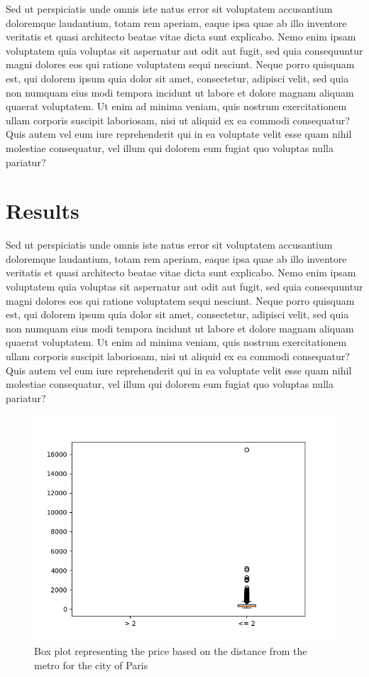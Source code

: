 \documentclass[10pt, conference, compsocconf]{IEEEtran}
\begin{document}
Sed ut perspiciatis unde omnis iste natus error sit voluptatem accusantium doloremque laudantium, totam rem aperiam, eaque ipsa quae ab illo inventore veritatis et quasi architecto beatae vitae dicta sunt explicabo. 
Nemo enim ipsam voluptatem quia voluptas sit aspernatur aut odit aut fugit, sed quia consequuntur magni dolores eos qui ratione voluptatem sequi nesciunt. Neque porro quisquam est, qui dolorem ipsum quia dolor sit amet, consectetur, adipisci velit, sed quia non numquam eius modi tempora incidunt ut labore et dolore magnam aliquam quaerat voluptatem. 
Ut enim ad minima veniam, quis nostrum exercitationem ullam corporis suscipit laboriosam, nisi ut aliquid ex ea commodi consequatur? Quis autem vel eum iure reprehenderit qui in ea voluptate velit esse quam nihil molestiae consequatur, vel illum qui dolorem eum fugiat quo voluptas nulla pariatur?
 
\section{Results}
Sed ut perspiciatis unde omnis iste natus error sit voluptatem accusantium doloremque laudantium, totam rem aperiam, eaque ipsa quae ab illo inventore veritatis et quasi architecto beatae vitae dicta sunt explicabo. 
Nemo enim ipsam voluptatem quia voluptas sit aspernatur aut odit aut fugit, sed quia consequuntur magni dolores eos qui ratione voluptatem sequi nesciunt. Neque porro quisquam est, qui dolorem ipsum quia dolor sit amet, consectetur, adipisci velit, sed quia non numquam eius modi tempora incidunt ut labore et dolore magnam aliquam quaerat voluptatem. 
Ut enim ad minima veniam, quis nostrum exercitationem ullam corporis suscipit laboriosam, nisi ut aliquid ex ea commodi consequatur? Quis autem vel eum iure reprehenderit qui in ea voluptate velit esse quam nihil molestiae consequatur, vel illum qui dolorem eum fugiat quo voluptas nulla pariatur?

\begin{figure}[ht]
  \centering
  \includegraphics[width=.8\textwidth]{figures/price-vs-distance-paris.png}
  \caption{Box plot representing the price based on the distance from the metro for the city of Paris}
  \label{fig:box-plot-paris}
\end{figure}
\end{document}
